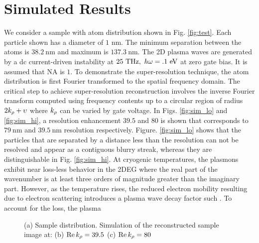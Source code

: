 \documentclass[11pt]{article}
\begin{document}
\section{Simulated Results}
%
We consider a sample with atom distribution shown in Fig. \ref{fig:test}. Each particle shown has a diameter of $1$ nm. The minimum separation between the atoms is $38.2~\mathrm{nm}$ and maximum is $137.3~\mathrm{nm}$. The 2D plasma waves are generated by a dc current-driven instability at $25~\mathrm{THz}, ~h\omega = .1~\mathrm{eV}$ at zero gate bias. It is assumed that NA is $1$. To demonstrate the super-resolution technique, the atom distribution is first Fourier transformed to the spatial frequency domain. The critical step to achieve super-resolution reconstruction involves the inverse Fourier transform computed using frequency contents up to a circular region of radius $2k_{\rho} + \upsilon$ where $k_{\rho}$ can be varied by gate voltage. In Figs. \ref{fig:sim_lo} and \ref{fig:sim_hi}, a resolution enhancement $39.5$ and $80$ is shown that corresponds to $79~\mathrm{nm}$ and $39.5~\mathrm{nm}$ resolution respectively. Figure. \ref{fig:sim_lo} shows that the particles that are separated by a distance less than the resolution can not be resolved and appear as a contiguous blurry streak, whereas they are distinguishable in Fig. \ref{fig:sim_hi}.
%
At cryogenic temperatures, the plasmons exhibit near loss-less behavior in the 2DEG where the real part of the wavenumber is at least three orders of magnitude greater than the imaginary part. However, as the temperature rises, the reduced electron mobility resulting due to electron scattering introduces a plasma wave decay factor such . To account for the loss, the plasma

\begin{figure}[t!]
   \hfil
   \hfil
  \caption{(a) Sample distribution. Simulation of the reconstructed sample image at: (b) $\Re k_{\rho} = 39.5$ (c) $\Re k_{\rho} = 80$}
  \label{fig:simulation}
\end{figure}
\end{document}
